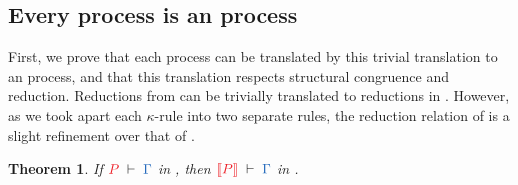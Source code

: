 \documentclass[submission,copyright,creativecommons]{eptcs}
\newtheorem{theorem}[lemma]{Theorem}
\begin{document}
\subsection{Every \cp process is an \hcp process}
First, we prove that each \cp process can be translated by this trivial translation to an \hcp process, and that this translation respects structural congruence and reduction. Reductions from \cp can be trivially translated to reductions in \hcp. However, as we took apart each $\kappa$-rule into two separate rules, the reduction relation of \hcp is a slight refinement over that of \cp.
\begin{theorem}\label{thm:cp2hcp-typing}
  If $\seq[P]{\Gamma}$ in \cp, then $\seq[\mtf{P}]{\Gamma}$ in \hcp.
\end{theorem}\vspace*{-0.75\baselineskip}%
\end{document}

